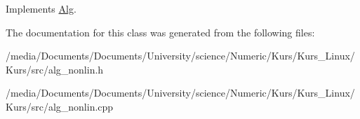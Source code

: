 Implements \hyperlink{classAlg_aa2436420b85976a48465408e9d86d425}{Alg}.



The documentation for this class was generated from the following files:\begin{DoxyCompactItemize}
\item 
/media/Documents/Documents/University/science/Numeric/Kurs/Kurs\_\-Linux/Kurs/src/alg\_\-nonlin.h\item 
/media/Documents/Documents/University/science/Numeric/Kurs/Kurs\_\-Linux/Kurs/src/alg\_\-nonlin.cpp\end{DoxyCompactItemize}
